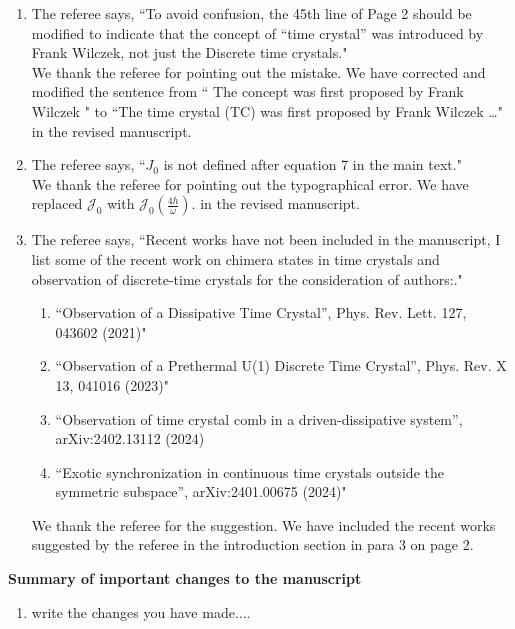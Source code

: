 \documentclass[aps,prb,reprint,showpacs,floatfix,superscriptaddress, onecolumn, nofootinbib, 10pt]{revtex4-2}
\newcommand{\response}[1]{{\color{black}#1}} %
\newcommand{\comment}[1]{{\color{blue}#1}} %
\begin{document}
\begin{enumerate}
\begin{enumerate}
		\item The referee says, \comment{``To avoid confusion, the 45th line of Page 2 should be modified to indicate that the concept of “time crystal” was introduced by Frank Wilczek, not just the Discrete time crystals."}\\
		
		\response{We thank the referee for pointing out the mistake. We have corrected and modified the sentence from `` The concept was
		first proposed by Frank Wilczek " to ``The time crystal (TC) was first proposed by Frank Wilczek \dots" in the revised manuscript.}
	
		\item The referee says, \comment{``$J_0$ is not defined after equation 7 in the main text."}\\
		
		\response{We thank the referee for pointing out the typographical error. We have replaced $\mathcal{J}_0$ with $\mathcal{J}_0\left(\frac{4h}{\omega}\right)$. in the revised manuscript.}
		
		\item The referee says, \comment{``Recent works have not been included in the manuscript, I list some of the recent work on chimera states in time crystals and observation of discrete-time crystals for the consideration of authors:."}
		\begin{enumerate}
			\item \comment{``Observation of a Dissipative Time Crystal”, Phys. Rev. Lett. 127, 043602 (2021)"}
			\item \comment{``Observation of a Prethermal U(1) Discrete Time Crystal”, Phys. Rev. X 13, 041016 (2023)"}
			\item \comment{``Observation of time crystal comb in a driven-dissipative system”, arXiv:2402.13112 (2024)}
			\item \comment{``Exotic synchronization in continuous time crystals outside the symmetric subspace”, arXiv:2401.00675 (2024)"}\\
		\end{enumerate}
		
		\response{
		We thank the referee for the suggestion. We have included the recent works suggested by the referee in the introduction section in para 3 on page 2. 
		}\\
	\end{enumerate}
\end{enumerate}
		
\noindent \textbf{Summary of important changes to the  manuscript}
\begin{enumerate}
	\item write the changes you have made$\dots$.
\end{enumerate}



\end{document}
